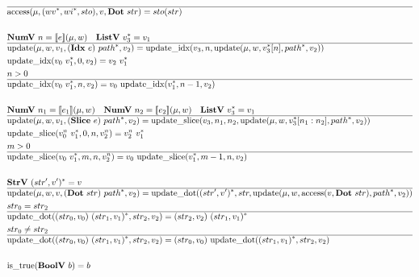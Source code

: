 \begin{align*}
  \hline
  &\access(\mu, (\seq{wv}, \seq{wi}, sto), v, \dotp ~ str) = sto(str) \\
%
\newline \\
  &\numv ~ n = \sem{e}(\mu, w) \quad
  \listv ~ \seq{v_3} = v_1 \\
  \hline
  &\update(\mu, w, v_1, (\idxp ~ e) ~ \seq{path}, v_2)
  =
  \updateidx(v_3, n, \update(\mu, w, \seq{v_3}[n], \seq{path}, v_2)) \\
  &\updateidx(v_0 ~ \seq{v_1}, 0, v_2) =  v_2 ~ \seq{v_1} \\
  &n > 0 \\
  \hline
  &\updateidx(v_0 ~ \seq{v_1}, n, v_2) =  v_0 ~ \updateidx(\seq{v_1}, n-1, v_2) \\
%
\newline \\
  &\numv ~ n_1 = \sem{e_1}(\mu, w) \quad
  \numv ~ n_2 = \sem{e_2}(\mu, w) \quad
  \listv ~ \seq{v_3} = v_1 \\
  \hline
  &\update(\mu, w, v_1, (\slicep ~ e) ~ \seq{path}, v_2)
  =
  \updateslice(v_3, n_1, n_2, \update(\mu, w, \seq{v_3}[n_1: n_2], \seq{path}, v_2)) \\
  &\updateslice(v_0^n ~ \seq{v_1}, 0, n, v_2^n) = v_2^n ~ \seq{v_1} \\
  &m > 0 \\
  \hline
  &\updateslice(v_0 ~ \seq{v_1}, m, n, v_2^n) =  v_0 ~ \updateslice(\seq{v_1}, m-1, n, v_2) \\
%
\newline \\
  &\strv ~ \seq{(str', v')} = v \\
  \hline
  &\update(\mu, w, v, (\dotp ~ str) ~ \seq{path}, v_2)
  =
  \updatedot(\seq{(str', v')}, str, \update(\mu, w, \access(v, \dotp ~ str), \seq{path}, v_2)) \\
  &str_0 = str_2 \\
  \hline
  &\updatedot((str_0, v_0) ~ \seq{(str_1, v_1)}, str_2, v_2)
  =
  (str_2, v_2) ~ \seq{(str_1, v_1)} \\
  &str_0 \not= str_2 \\
  \hline
  &\updatedot((str_0, v_0) ~ \seq{(str_1, v_1)}, str_2, v_2)
  =
  (str_0, v_0) ~ \updatedot(\seq{(str_1, v_1)}, str_2, v_2) \\
%
\newline \\
  &\istrue(\boolv ~ b) = b \\

\end{align*}

